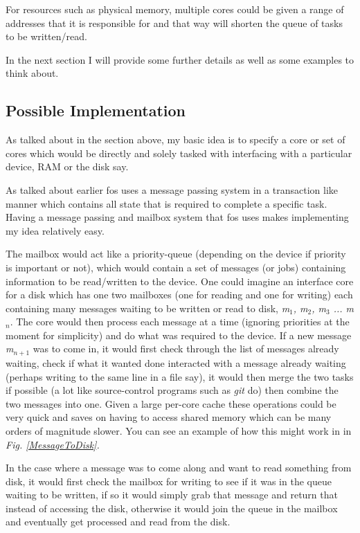 \documentclass[journal]{IEEEtran}
\begin{document}
For resources such as physical memory, multiple cores could be given a range of addresses that it is responsible for and that way will shorten the queue of tasks to be written/read.

In the next section I will provide some further details as well as some examples to think about.

\subsection{Possible Implementation}

As talked about in the section above, my basic idea is to specify a core or set of cores which would be directly and solely tasked with interfacing with a particular device, RAM or the disk say. 

As talked about earlier fos uses a message passing system in a transaction like manner which contains all state that is required to complete a specific task. Having a message passing and mailbox system that fos uses makes implementing my idea relatively easy.

The mailbox would act like a priority-queue (depending on the device if priority is important or not), which would contain a set of messages (or jobs) containing information to be read/written to the device. One could imagine an interface core for a disk which has one two mailboxes (one for reading and one for writing) each containing many messages waiting to be written or read to disk, \emph{m$_{1}$, m$_{2}$, m$_{3}$ ... m$_{n}$}. The core would then process each message at a time (ignoring priorities at the moment for simplicity) and do what was required to the device. If a new message \emph{m$_{n+1}$} was to come in, it would first check through the list of messages already waiting, check if what it wanted done interacted with a message already waiting (perhaps writing to the same line in a file say), it would then merge the two tasks if possible (a lot like source-control programs such as \emph{git} do) then combine the two messages into one. Given a large per-core cache these operations could be very quick and saves on having to access shared memory which can be many orders of magnitude slower. You can see an example of how this might work in in \emph{Fig. \ref{MessageToDisk}.}

In the case where a message was to come along and want to read something from disk, it would first check the mailbox for writing to see if it was in the queue waiting to be written, if so it would simply grab that message and return that instead of accessing the disk, otherwise it would join the queue in the mailbox and eventually get processed and read from the disk.
\end{document}
